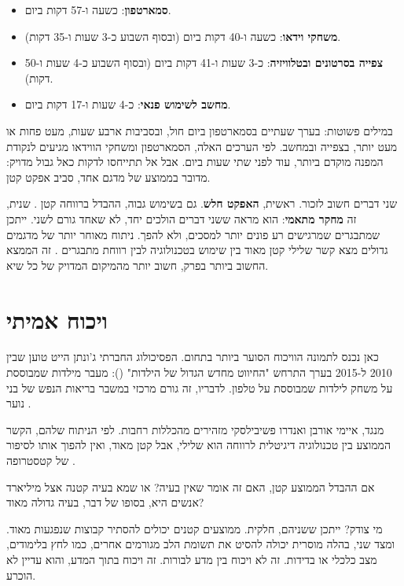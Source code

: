 \begin{itemize}
  \item \textbf{סמארטפון}: כשעה ו-57 דקות ביום.
  \item \textbf{משחקי וידאו}: כשעה ו-40 דקות ביום (ובסוף השבוע כ-3 שעות ו-35 דקות).
  \item \textbf{צפייה בסרטונים ובטלוויזיה}: כ-3 שעות ו-41 דקות ביום (ובסוף השבוע כ-4 שעות ו-50 דקות).
  \item \textbf{מחשב לשימוש פנאי}: כ-4 שעות ו-17 דקות ביום.
\end{itemize}

במילים פשוטות: בערך שעתיים בסמארטפון ביום חול, ובסביבות ארבע שעות, מעט פחות או מעט יותר, בצפייה ובמחשב. לפי הערכים האלה, הסמארטפון ומשחקי הווידאו מגיעים לנקודת המפנה מוקדם ביותר, עוד לפני שתי שעות ביום. אבל אל תתייחסו לדקות כאל גבול מדויק: מדובר בממוצע של מדגם אחד, סביב אפקט קטן.

\begin{alertbox}
שני דברים חשוב לזכור. ראשית, \textbf{האפקט חלש}. גם בשימוש גבוה, ההבדל ברווחה קטן \parencite{przybylski2017}. שנית, זה \textbf{מחקר מתאמי}: הוא מראה ששני דברים הולכים יחד, לא שאחד גורם לשני. ייתכן שמתבגרים שמרגישים רע פונים יותר למסכים, ולא להפך. ניתוח מאוחר יותר של מדגמים גדולים מצא קשר שלילי קטן מאוד בין שימוש בטכנולוגיה לבין רווחת מתבגרים \parencite{orben2019}. זה הממצא החשוב ביותר בפרק, חשוב יותר מהמיקום המדויק של כל שיא.
\end{alertbox}

\section{ויכוח אמיתי}

כאן נכנס לתמונה הוויכוח הסוער ביותר בתחום. הפסיכולוג החברתי ג'ונתן הייט טוען שבין 2010 ל-2015 בערך התרחש "החיווט מחדש הגדול של הילדות" (): מעבר מילדות שמבוססת על משחק לילדות שמבוססת על טלפון. לדבריו, זה גורם מרכזי במשבר בריאות הנפש של בני נוער \parencite{haidt2024}.

מנגד, איימי אורבן ואנדרו פשיבילסקי מזהירים מהכללות רחבות. לפי הניתוח שלהם, הקשר הממוצע בין טכנולוגיה דיגיטלית לרווחה הוא שלילי, אבל קטן מאוד, ואין להפוך אותו לסיפור של קטסטרופה \parencite{orben2019}.

\begin{thinkbox}
אם ההבדל הממוצע קטן, האם זה אומר שאין בעיה? או שמא בעיה קטנה אצל מיליארד אנשים היא, בסופו של דבר, בעיה גדולה מאוד?
\end{thinkbox}

מי צודק? ייתכן ששניהם, חלקית. ממוצעים קטנים יכולים להסתיר קבוצות שנפגעות מאוד. ומצד שני, בהלה מוסרית יכולה להסיט את תשומת הלב מגורמים אחרים, כמו לחץ בלימודים, מצב כלכלי או בדידות. זה לא ויכוח בין מדע לבורות. זה ויכוח בתוך המדע, והוא עדיין לא הוכרע.
